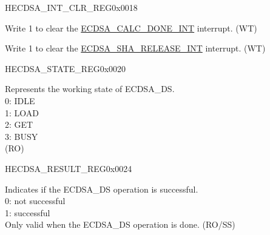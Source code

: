 \begin{register}{H}{ECDSA\_INT\_CLR\_REG}{0x0018}\label{regdesc:ECDSAINTCLRREG}
%
%
%
\regnewline%
\begin{regdesc}\begin{reglist}
\label{fielddesc:ECDSACALCDONEINTCLR}\item [ECDSA\_CALC\_DONE\_INT\_CLR] Write 1 to clear the \hyperref[int:ECDSACALCDONEINT]{ECDSA\_CALC\_DONE\_INT} interrupt. (WT)
\label{fielddesc:ECDSASHARELEASEINTCLR}\item [ECDSA\_SHA\_RELEASE\_INT\_CLR] Write 1 to clear the \hyperref[int:ECDSASHARELEASEINT]{ECDSA\_SHA\_RELEASE\_INT} interrupt. (WT)
\end{reglist}\end{regdesc}
\end{register}


\begin{register}{H}{ECDSA\_STATE\_REG}{0x0020}\label{regdesc:ECDSASTATEREG}
%
%
\regnewline%
\begin{regdesc}\begin{reglist}
\label{fielddesc:ECDSABUSY}\item [ECDSA\_BUSY] Represents the working state of ECDSA\_DS.\\
0: IDLE\\
1: LOAD\\
2: GET\\
3: BUSY\\
(RO)
\end{reglist}\end{regdesc}
\end{register}


\begin{register}{H}{ECDSA\_RESULT\_REG}{0x0024}\label{regdesc:ECDSARESULTREG}
%
%
\regnewline%
\begin{regdesc}\begin{reglist}
\label{fielddesc:ECDSAOPERATIONRESULT}\item [ECDSA\_OPERATION\_RESULT] Indicates if the ECDSA\_DS operation is successful.\\
0: not successful\\
1: successful\\
Only valid when the ECDSA\_DS operation is done. (RO/SS)
\end{reglist}\end{regdesc}
\end{register}

